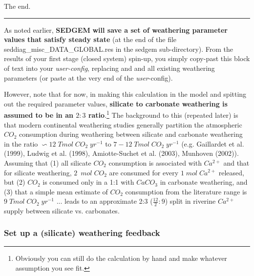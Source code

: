 \begin{enumerate}[noitemsep]
\vspace{2mm}
The end.

\noindent\rule{4cm}{0.5pt}
\vspace{1mm}

As noted earlier, \textbf{SEDGEM} \textbf{will save a set of weathering parameter values that satisfy steady state} (at the end of the file \textsf{\footnotesize seddiag\_misc\_DATA\_GLOBAL.res} in the \textsf{\footnotesize sedgem} sub-directory). From the results of your first stage (closed system) spin-up, you simply copy-past this block of text into your \textit{user-config}, replacing and and all existing weathering parameters (or paste at the very end of the \textit{user}-config).

\vspace{1mm}

However, note that for now, in making this calculation in the model and spitting out the required parameter values, \textbf{silicate to carbonate weathering is assumed to be in an \(2:3\) ratio}.\footnote{Obviously you can still do the calculation by hand and make whatever assumption you see fit.} The background to this (repeated later) is that modern continental weathering studies generally partition the atmospheric \(CO_{2}\) consumption during weathering between silicate and carbonate weathering in the ratio \(\backsim12\;Tmol\;CO_{2}\;yr^{-1}\) to \(7-12\;Tmol\;CO_{2}\;yr^{-1}\) (e.g. Gaillardet et al. (1999), Ludwig et al. (1998), Amiotte-Suchet et al. (2003), Munhoven (2002)). Assuming that (1) all silicate \(CO_{2}\) consumption is associated with \(Ca^{2+}\) and that for silicate weathering, \(2\;\ mol\; CO_{2}\) are consumed for every \(1\;mol\;Ca^{2+}\) released, but (2) \(CO_{2}\) is consumed only in a 1:1 with \(CaCO_{3}\) in carbonate weathering, and (3) that a simple mean estimate of  \(CO_{2}\) consumption from the literature range is  \(9\;Tmol\;CO_{2}\;yr^{-1}\) ... leads to an approximate 2:3 (\(\frac{12}{2}:9\)) split in riverine \(Ca^{2+}\) supply between silicate vs. carbonates.


\end{enumerate}

%
\newpage
\subsubsection{Set up a (silicate) weathering feedback}\label{subsec:set_up_a_weathering_feedback}
\vspace{1mm}

